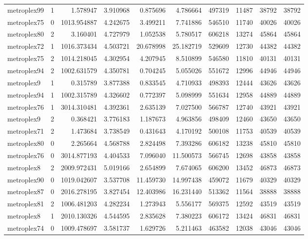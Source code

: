 \begin{longtable}{|l|r|r|r|r|r|r|r|r|r|}
metroplex99 & 1 & 1.578947 & 3.910968 & 0.875696 & 4.786664 & 497319 & 11487 & 38792 & 38792 \\
metroplex75 & 0 & 1013.954887 & 4.242675 & 3.499211 & 7.741886 & 546510 & 11740 & 40026 & 40026 \\
metroplex80 & 2 & 3.160401 & 4.727979 & 1.052538 & 5.780517 & 606218 & 13274 & 45864 & 45864 \\
metroplex72 & 1 & 1016.373434 & 4.503721 & 20.678998 & 25.182719 & 529609 & 12730 & 44382 & 44382 \\
metroplex75 & 2 & 1014.218045 & 4.302954 & 4.207945 & 8.510899 & 546580 & 11810 & 40131 & 40131 \\
metroplex94 & 2 & 1002.631579 & 4.350781 & 0.704245 & 5.055026 & 551672 & 12996 & 44946 & 44946 \\
metroplex9 & 1 & 0.315789 & 3.877388 & 0.833545 & 4.710933 & 498393 & 12444 & 43626 & 43626 \\
metroplex94 & 1 & 1002.315789 & 4.326602 & 0.772397 & 5.098999 & 551634 & 12958 & 44889 & 44889 \\
metroplex76 & 1 & 3014.310481 & 4.392361 & 2.635139 & 7.027500 & 566787 & 12740 & 43921 & 43921 \\
metroplex9 & 2 & 0.368421 & 3.776183 & 1.187673 & 4.963856 & 498409 & 12460 & 43650 & 43650 \\
metroplex71 & 2 & 1.473684 & 3.738549 & 0.431643 & 4.170192 & 500108 & 11753 & 40539 & 40539 \\
metroplex80 & 0 & 2.265664 & 4.568788 & 2.824498 & 7.393286 & 606182 & 13238 & 45810 & 45810 \\
metroplex76 & 0 & 3014.877193 & 4.404533 & 7.096040 & 11.500573 & 566745 & 12698 & 43858 & 43858 \\
metroplex8 & 2 & 2009.972431 & 5.019166 & 2.654899 & 7.674065 & 606200 & 13452 & 46873 & 46873 \\
metroplex90 & 0 & 1019.042607 & 3.537708 & 11.459730 & 14.997438 & 459072 & 11679 & 40329 & 40329 \\
metroplex87 & 0 & 2016.278195 & 3.827454 & 12.403986 & 16.231440 & 513362 & 11564 & 38888 & 38888 \\
metroplex81 & 2 & 1006.481203 & 4.282234 & 1.273943 & 5.556177 & 569375 & 12592 & 43519 & 43519 \\
metroplex8 & 1 & 2010.130326 & 4.544595 & 2.835628 & 7.380223 & 606172 & 13424 & 46831 & 46831 \\
metroplex74 & 0 & 1009.478697 & 3.581737 & 1.629726 & 5.211463 & 463582 & 12038 & 43046 & 43046 \\

\end{longtable}
